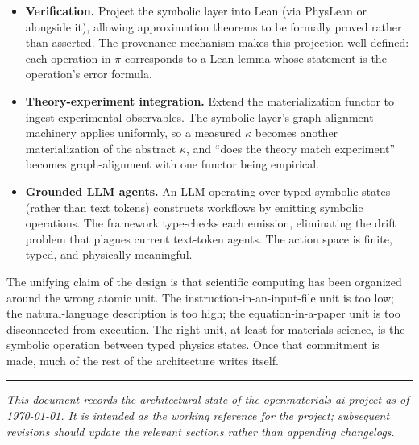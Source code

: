 \documentclass[11pt,a4paper]{article}
\begin{document}
\begin{itemize}[leftmargin=2em]
  \item \textbf{Verification.} Project the symbolic layer into Lean (via PhysLean or alongside
        it), allowing approximation theorems to be formally proved rather than asserted. The
        provenance mechanism makes this projection well-defined: each operation in $\pi$
        corresponds to a Lean lemma whose statement is the operation's error formula.
  \item \textbf{Theory-experiment integration.} Extend the materialization functor to ingest
        experimental observables. The symbolic layer's graph-alignment machinery applies uniformly,
        so a measured $\kappa$ becomes another materialization of the abstract $\kappa$, and
        ``does the theory match experiment'' becomes graph-alignment with one functor being
        empirical.
  \item \textbf{Grounded LLM agents.} An LLM operating over typed symbolic states (rather than
        text tokens) constructs workflows by emitting symbolic operations. The framework
        type-checks each emission, eliminating the drift problem that plagues current
        text-token agents. The action space is finite, typed, and physically meaningful.
\end{itemize}

The unifying claim of the design is that scientific computing has been organized around the
wrong atomic unit. The instruction-in-an-input-file unit is too low; the natural-language
description is too high; the equation-in-a-paper unit is too disconnected from execution. The
right unit, at least for materials science, is the symbolic operation between typed physics
states. Once that commitment is made, much of the rest of the architecture writes itself.

\bigskip
\hrule
\bigskip

\noindent\emph{This document records the architectural state of the openmaterials-ai project as
of \today. It is intended as the working reference for the project; subsequent revisions should
update the relevant sections rather than appending changelogs.}
\end{document}
